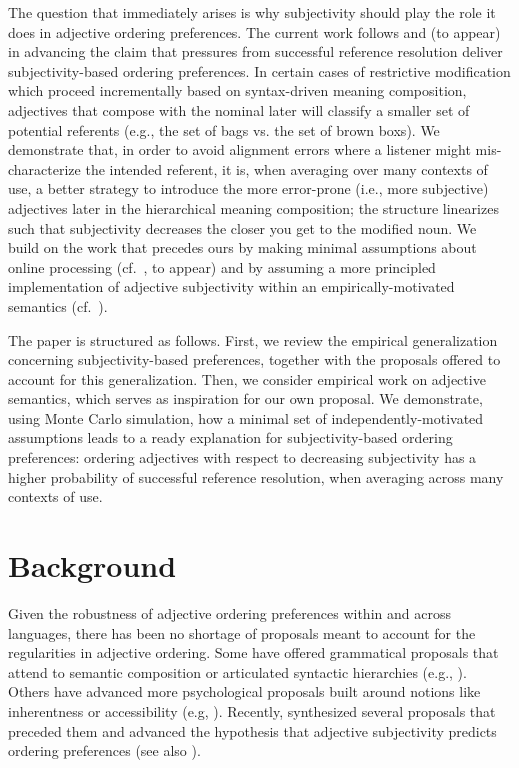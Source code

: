 \documentclass[10pt,a4paper]{article}
\begin{document}
The question that immediately arises is why subjectivity should play the role it does in adjective ordering preferences. The current work follows  and \citeauthor{scontrasetalSPadjectives} (to appear) in advancing the claim that pressures from successful reference resolution deliver subjectivity-based ordering preferences. In certain cases of restrictive
modification which proceed incrementally based on syntax-driven meaning composition, adjectives that compose with the nominal later will classify a smaller set of potential referents (e.g., the set of bags vs. the set of brown boxs). We demonstrate that, in order to avoid alignment errors where a listener might mis-characterize the intended referent, it is, when averaging over many contexts of use, a better strategy to introduce the more error-prone (i.e., more subjective) adjectives later in the hierarchical meaning composition; the structure linearizes such that subjectivity decreases the closer you get to the modified noun. We build on the work that precedes ours by making minimal assumptions about online processing (cf.~\citeauthor{scontrasetalSPadjectives}, to appear) and by assuming a more principled implementation of adjective subjectivity within an empirically-motivated semantics (cf.~).

The paper is structured as follows. First, we review the empirical generalization concerning subjectivity-based preferences, together with the proposals offered to account for this generalization. Then, we consider empirical work on adjective semantics, which serves as inspiration for our own proposal. We demonstrate, using Monte Carlo simulation, how a minimal set of independently-motivated assumptions leads to a ready explanation for subjectivity-based ordering preferences: ordering adjectives with respect to decreasing subjectivity has a higher probability of successful reference resolution, when averaging across many contexts of use. 

\section{Background}

Given the robustness of adjective ordering preferences within and across languages, there has been no shortage of proposals meant to account for the regularities in adjective ordering. Some have offered grammatical proposals that attend to semantic composition or articulated syntactic hierarchies (e.g., ). Others have advanced more psychological proposals built around notions like inherentness or accessibility (e.g, ). Recently,  synthesized several proposals that preceded them and advanced the hypothesis that adjective subjectivity predicts ordering preferences (see also ). 
\end{document}
